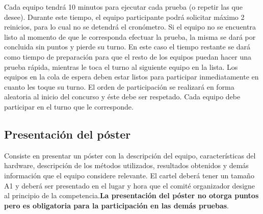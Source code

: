 \documentclass[letterpaper,12pt]{article}
\begin{document}
Cada equipo tendrá 10 minutos para ejecutar cada prueba (o repetir las que desee). Durante este tiempo, el equipo participante podrá solicitar máximo 2 reinicios, para lo cual no se detendrá el cronómetro. Si el equipo no se encuentra listo al momento de que le corresponda
efectuar la prueba, la misma se dará por concluida sin puntos y pierde su turno. En este caso el tiempo restante se dará como tiempo de preparación para que el resto de los equipos puedan hacer una prueba rápida, mientras le toca el turno al siguiente equipo en la lista. Los equipos en la cola de espera deben estar listos para participar inmediatamente en cuanto les toque su turno. El orden de participación se realizará en forma aleatoria al inicio del concurso y éste debe ser respetado. Cada equipo debe participar en el turno que le corresponde.

\subsection{Presentación del póster}
Consiste en presentar un póster con la descripción del equipo, características del hardware, descripción de los métodos utilizados, resultados obtenidos y demás información que el equipo considere relevante. El cartel deberá tener un tamaño A1 y deberá ser presentado en el lugar y hora que el comité organizador designe al principio de la competencia.\textbf{La presentación del póster no otorga puntos pero es obligatoria para la participación en las demás pruebas}.

\end{document}
